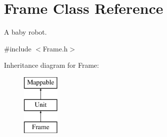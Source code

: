 \hypertarget{classFrame}{
\section{Frame Class Reference}
\label{classFrame}
}


A baby robot.  




{\ttfamily \#include $<$Frame.h$>$}

Inheritance diagram for Frame:\begin{figure}[H]
\begin{center}
\leavevmode
\includegraphics[height=3cm]{classFrame}
\end{center}
\end{figure}
